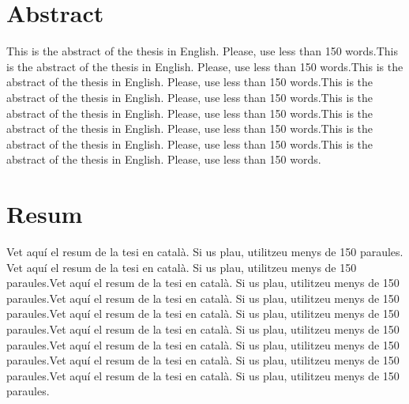 \documentclass[11pt, a4paper,twoside]{tfg_dtic_upf}
\numberwithin{equation}{section}
\begin{document}


 \newline
\noindent 
\cleardoublepage


\section*{\Large \sffamily Abstract}
This is the abstract of the thesis in English.  Please, use less
than 150 words.This is the abstract of the thesis in English.  Please, use less
than 150 words.This is the abstract of the thesis in English.  Please, use less
than 150 words.This is the abstract of the thesis in English.  Please, use less
than 150 words.This is the abstract of the thesis in English.  Please, use less
than 150 words.This is the abstract of the thesis in English.  Please, use less
than 150 words.This is the abstract of the thesis in English.  Please, use less
than 150 words.This is the abstract of the thesis in English.  Please, use less
than 150 words.

\vspace*{\fill}
\section*{\Large \sffamily  Resum}
Vet aquí el resum de la tesi en català.  Si us plau, utilitzeu
menys de 150 paraules. Vet aquí el resum de la tesi en català.  Si us plau, utilitzeu
menys de 150 paraules.Vet aquí el resum de la tesi en català.  Si us plau, utilitzeu
menys de 150 paraules.Vet aquí el resum de la tesi en català.  Si us plau, utilitzeu
menys de 150 paraules.Vet aquí el resum de la tesi en català.  Si us plau, utilitzeu
menys de 150 paraules.Vet aquí el resum de la tesi en català.  Si us plau, utilitzeu
menys de 150 paraules.Vet aquí el resum de la tesi en català.  Si us plau, utilitzeu
menys de 150 paraules.Vet aquí el resum de la tesi en català.  Si us plau, utilitzeu
menys de 150 paraules.Vet aquí el resum de la tesi en català.  Si us plau, utilitzeu
menys de 150 paraules.
\vspace*{\fill}

\vspace*{\fill}
\end{document}
